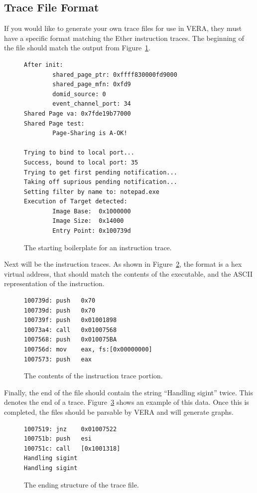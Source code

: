 \documentclass[11pt]{article}
\begin{document}
\subsection{Trace File Format}

If you would like to generate your own trace files for use in VERA,
they must have a specific format matching the Ether instruction
traces. The beginning of the file should match the output from
Figure~\ref{fig:boilerplate}. 

\begin{figure}[htb]
\centering
\begin{verbatim}
After init:
        shared_page_ptr: 0xffff830000fd9000
        shared_page_mfn: 0xfd9
        domid_source: 0
        event_channel_port: 34
Shared Page va: 0x7fde19b77000
Shared Page test:
        Page-Sharing is A-OK!

Trying to bind to local port...
Success, bound to local port: 35
Trying to get first pending notification...
Taking off suprious pending notification...
Setting filter by name to: notepad.exe
Execution of Target detected:
        Image Base:  0x1000000
        Image Size:  0x14000
        Entry Point: 0x100739d
\end{verbatim}
\caption{The starting boilerplate for an instruction trace.}\label{fig:boilerplate}
\end{figure}

Next will be the instruction traces. As
shown in Figure~\ref{fig:instructions}, the format is a hex virtual address,
that should match the contents of the executable, and the
ASCII representation of the instruction.  

\begin{figure}[htb]
\centering
\begin{verbatim}
100739d: push   0x70
100739d: push   0x70
100739f: push   0x01001898
10073a4: call   0x01007568
1007568: push   0x010075BA
100756d: mov    eax, fs:[0x00000000]
1007573: push   eax
\end{verbatim}
\caption{The contents of the instruction trace portion.}\label{fig:instructions}
\end{figure}

Finally, the end of the file should contain the string ``Handling
sigint'' twice. This denotes the end of a trace. Figure~\ref{fig:end}
shows an example of this data. Once this is
completed, the files should be parsable by VERA and will generate
graphs.

\begin{figure}[htb]
\centering
\begin{verbatim}
1007519: jnz	0x01007522
100751b: push	esi
100751c: call	[0x1001318]
Handling sigint
Handling sigint
\end{verbatim}
\caption{The ending structure of the trace file.}\label{fig:end}
\end{figure}
\end{document}
